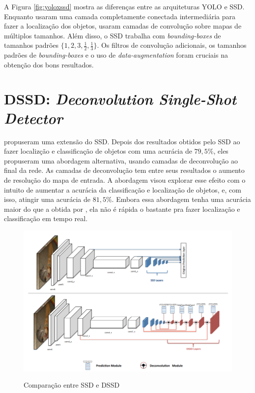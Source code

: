 A Figura \ref{fig:yoloxssd} mostra as diferenças entre as arquiteturas \ac{YOLO} e \ac{SSD}. Enquanto  usaram uma camada completamente conectada intermediária para fazer a localização dos objetos,  usaram camadas de convolução sobre mapas de múltiplos tamanhos. Além disso, o \ac{SSD} trabalha com \textit{bounding-boxes} de tamanhos padrões $\{1, 2, 3, \frac{1}{2}, \frac{1}{3}\}$. Os filtros de convolução adicionais, os tamanhos padrões de \textit{bounding-boxes} e o uso de \textit{data-augmentation} foram cruciais na obtenção dos bons resultados.

\section{DSSD: \textit{Deconvolution Single-Shot Detector}}

 propuseram uma extensão do \ac{SSD}. Depois dos resultados obtidos pelo \ac{SSD} ao fazer localizção e classificação de objetos com uma acurácia de $79,5\%$, eles propuseram uma abordagem alternativa, usando camadas de deconvolução ao final da rede. As camadas de deconvolução tem entre seus resultados o aumento de resolução do mapa de entrada. A abordagem visou explorar esse efeito com o intuito de aumentar a acurácia da classificação e localização de objetos, e, com isso, atingir uma acurácia de $81,5\%$. Embora essa abordagem tenha uma acurácia maior do que a obtida por , ela não é rápida o bastante pra fazer localização e classificação em tempo real.


\begin{figure}[H]
	\setlength{\abovecaptionskip}{0pt}
	\setlength{\belowcaptionskip}{0pt}
	\caption[SSD e DSSD]{Comparação entre \ac{SSD} e \ac{DSSD}}
	\centering
	\includegraphics[width=.8\textwidth]{imagem/0x_comparacao_ssd_dssd.png}
	\captionsetup{justification=centering}
	\label{fig:ssdxdssd}
\end{figure}


